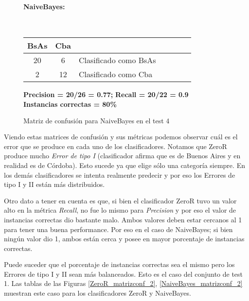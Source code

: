 \begin{figure}[H]
	\centering
	\paragraph*{NaiveBayes:}\mbox{}\\
	\begin{table}[H]
		\centering
		\begin{tabular}{|c|c|l|c|c|c|c|}
			\hline
			BsAs & Cba &  \\ \hline
			20 &  6 &  Clasificado como BsAs \\ \hline
			2  &  12 &  Clasificado como Cba \\ \hline
		\end{tabular}
	\end{table}
	\begin{center}
		\textbf{Precision = 20/26 = 0.77;} \textbf{Recall = 20/22 = 0.9}\\
		\textbf{Instancias correctas = 80\%}
	\end{center}
	\caption{Matriz de confusión para NaiveBayes en el test 4}
	\label{NaiveBayes_matrizconf}
\end{figure}

Viendo estas matrices de confusión y sus métricas podemos observar cuál es el error que se produce en cada uno de los clasificadores. Notamos que ZeroR produce mucho \textit{Error de tipo I} (clasificador afirma que es de Buenos Aires y en realidad es de Córdoba). Esto sucede ya que elige sólo una categoría siempre. En los demás clasificadores se intenta realmente predecir y por eso los Errores de tipo I y II están más distribuidos.

Otro dato a tener en cuenta es que, si bien el clasificador ZeroR tuvo un valor alto en la métrica \textit{Recall}, no fue lo mismo para \textit{Precision} y por eso el valor de instancias correctas dio bastante malo. Ambos valores deben estar cercanos al 1 para tener una buena performance. Por eso en el caso de NaiveBayes; si bien ningún valor dio 1, ambos están cerca y posee en mayor porcentaje de instancias correctas.

Puede suceder que el porcentaje de instancias correctas sea el mismo pero los Errores de tipo I y II sean más balanceados. Esto es el caso del conjunto de test 1. Las tablas de las Figuras \ref{ZeroR_matrizconf_2}, \ref{NaiveBayes_matrizconf_2} muestran este caso para los clasificadores ZeroR y NaiveBayes.


